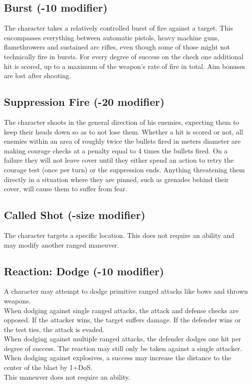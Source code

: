 \subsection*{Burst (-10 modifier)}
The character takes a relatively controlled burst of fire against a target. This encompasses everything between automatic pistols, heavy machine guns, flamethrowers and sustained arc rifles, even though some of those might not technically fire in bursts. For every degree of success on the check one additional hit is scored, up to a maximum of the weapon’s rate of fire in total. Aim bonuses are lost after shooting.
\subsection*{Suppression Fire (-20 modifier)}
The character shoots in the general direction of his enemies, expecting them to keep their heads down so as to not lose them. Whether a hit is scored or not, all enemies within an area of roughly twice the bullets fired in meters diameter are making courage checks at a penalty equal to 4 times the bullets fired. On a failure they will not leave cover until they either spend an action to retry the courage test (once per turn) or the suppression ends. Anything threatening them directly in a situation where they are pinned, such as grenades behind their cover, will cause them to suffer from fear.
\subsection*{Called Shot (-size modifier)}
The character targets a specific location. This does not require an ability and may modify another ranged maneuver.
\subsection*{Reaction: Dodge (-10 modifier)}
A character may attempt to dodge primitive ranged attacks like bows and thrown weapons.\\
When dodging against single ranged attacks, the attack and defense checks are opposed. If the attacker wins, the target suffers damage. If the defender wins or the test ties, the attack is evaded.\\
When dodging against multiple ranged attacks, the defender dodges one hit per degree of success. The reaction may still only be taken against a single attacker.\\
When dodging against explosives, a success may increase the distance to the center of the blast by 1+DoS.\\
This maneuver does not require an ability.

